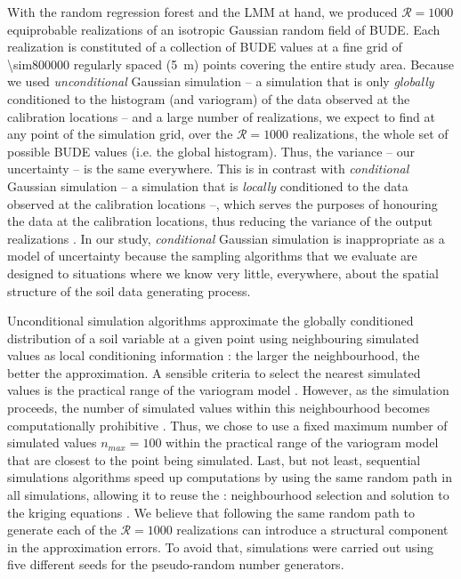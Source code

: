 {With the random regression forest and the LMM at hand, we produced $\mathcal{R} = 1000$ equiprobable 
realizations of an isotropic Gaussian random field of BUDE. Each realization is constituted of a collection of 
BUDE values at a fine grid of \num{\sim800000} regularly spaced (\SI{5}{\metre}) points covering the entire 
study area. Because we used \emph{unconditional} Gaussian simulation -- a simulation that is only 
\emph{globally} conditioned to the histogram (and variogram) of the data observed at the calibration locations 
\cite{Goovaerts1997} -- and a large number of realizations, we expect to find at any point of the simulation 
grid, over the $\mathcal{R} = 1000$ realizations, the whole set of possible BUDE values (i.e. the global 
histogram). Thus, the variance -- our uncertainty -- is the same everywhere. This is in contrast with 
\emph{conditional} Gaussian simulation -- a simulation that is \emph{locally} conditioned to the data observed 
at the calibration locations --, which serves the purposes of honouring the data at the calibration locations, 
thus reducing the variance of the output realizations \cite{Goovaerts1997}. In our study, \emph{conditional} 
Gaussian simulation is inappropriate as a model of uncertainty because the sampling algorithms that we evaluate 
are designed to situations where we know very little, everywhere, about the spatial structure of the soil data 
generating process.

Unconditional simulation algorithms approximate the globally conditioned distribution of a soil variable at a 
given point using neighbouring simulated values as local conditioning information \cite{Goovaerts1997}: the 
larger the neighbourhood, the better the approximation. A sensible criteria to select the nearest simulated 
values is the practical range of the variogram model \cite{Pebesma2004}. However, as the simulation proceeds, 
the number of simulated values within this neighbourhood becomes computationally prohibitive 
\cite{WebsterEtAl2007}. Thus, we chose to use a fixed maximum number of simulated values $n_{max} = 100$ 
within the practical range of the variogram model that are closest to the point being simulated. Last, but not 
least, sequential simulations algorithms speed up computations by using the same random path in all 
simulations, allowing it to reuse the : neighbourhood selection and solution to the 
kriging equations \cite{Pebesma2004}. We believe that following the same random path to generate each of the 
$\mathcal{R} = 1000$ realizations can introduce a structural component in the approximation errors. To avoid 
that, simulations were carried out using five different seeds for the pseudo-random number generators.

}
